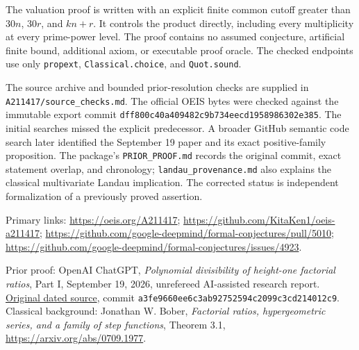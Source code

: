 The valuation proof is written with an explicit finite common cutoff
greater than $30n$, $30r$, and $kn+r$.  It controls the product directly,
including every multiplicity at every prime-power level.  The proof
contains no assumed conjecture, artificial finite bound, additional
axiom, or executable proof oracle.  The checked endpoints use only
\texttt{propext}, \texttt{Classical.choice}, and \texttt{Quot.sound}.

The source archive and bounded prior-resolution checks are supplied in
\texttt{A211417/source\_checks.md}.  The official OEIS bytes were checked
against the immutable export commit
\texttt{dff800c40a409482c9b734eecd1958986302e385}.  The initial searches missed the explicit predecessor. A broader
GitHub semantic code search later identified the September 19 paper
and its exact positive-family proposition. The package's
\texttt{PRIOR\_PROOF.md} records the original commit, exact statement
overlap, and chronology; \texttt{landau\_provenance.md} also explains
the classical multivariate Landau implication. The corrected status
is independent formalization of a previously proved assertion.

Primary links: \url{https://oeis.org/A211417};
\url{https://github.com/KitaKen1/oeis-a211417};
\url{https://github.com/google-deepmind/formal-conjectures/pull/5010};
\url{https://github.com/google-deepmind/formal-conjectures/issues/4923}.


Prior proof: OpenAI ChatGPT, \emph{Polynomial divisibility of height-one
factorial ratios}, Part I, September 19, 2026, unrefereed AI-assisted
research report. \href{https://github.com/VladimirReshetnikov/ProveIt/blob/a3fe9660ee6c3ab92752594c2099c3cd214012c9/docs/reports/congruences-and-valuations/factorial-ratio-polynomial-divisibility/article.tex}{Original dated source}, commit
\texttt{a3fe9660ee6c3ab92752594c2099c3cd214012c9}.
Classical background: Jonathan W. Bober, \emph{Factorial ratios,
hypergeometric series, and a family of step functions}, Theorem 3.1,
\url{https://arxiv.org/abs/0709.1977}.
